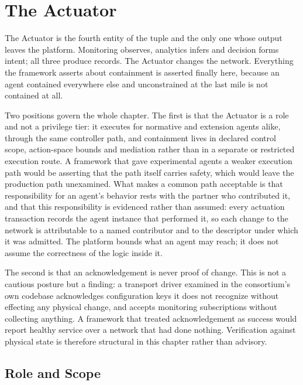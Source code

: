 
\hypertarget{the-actuator}{%
\section{The Actuator}\label{the-actuator}}

The Actuator is the fourth entity of the tuple and the only one whose
output leaves the platform. Monitoring observes, analytics infers and
decision forms intent; all three produce records. The Actuator changes
the network. Everything the framework asserts about containment is
asserted finally here, because an agent contained everywhere else and
unconstrained at the last mile is not contained at all.

Two positions govern the whole chapter. The first is that the Actuator
is a role and not a privilege tier: it executes for normative and
extension agents alike, through the same controller path, and
containment lives in declared control scope, action-space bounds and
mediation rather than in a separate or restricted execution route. A
framework that gave experimental agents a weaker execution path would be
asserting that the path itself carries safety, which would leave the
production path unexamined. What makes a common path acceptable is that
responsibility for an agent's behavior rests with the partner who
contributed it, and that this responsibility is evidenced rather than
assumed: every actuation transaction records the agent instance that
performed it, so each change to the network is attributable to a named
contributor and to the descriptor under which it was admitted. The
platform bounds what an agent may reach; it does not assume the
correctness of the logic inside it.

The second is that an acknowledgement is never proof of change. This is
not a cautious posture but a finding: a transport driver examined in the
consortium's own codebase acknowledges configuration keys it does not
recognize without effecting any physical change, and accepts monitoring
subscriptions without collecting anything. A framework that treated
acknowledgement as success would report healthy service over a network
that had done nothing. Verification against physical state is therefore
structural in this chapter rather than advisory.

\hypertarget{role-and-scope}{%
\subsection{Role and Scope}\label{role-and-scope}}

